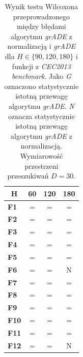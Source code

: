 \documentclass[12pt,a4paper]{report}
\begin{document}
{{{{{{{\begin{table}[h]
\centering
\caption{Wynik testu Wilcoxona przeprowadzonego między błędami algorytmu \emph{grADE} z normalizacją i \emph{grADE} dla $H \in \{90, 120, 180\}$ i funkcji z \emph{CEC2013 benchmark}. Jako \emph{G} oznaczono statystycznie istotną przewagę algorytmu \emph{grADE}. \emph{N} oznacza statystycznie istotną przewagę algorytmu \emph{grADE} z normalizacją. Wymiarowość przestrzeni przeszukiwań $D = 30$.}
\label{Anal11a}
\begin{tabular}{|l|c|c|c|}
\hline
\multicolumn{1}{|c|}{{\bf H}}          & \multicolumn{1}{l|}{{\bf60}} & \multicolumn{1}{l|}{{\bf120}} & \multicolumn{1}{l|}{{\bf180}} \\ \hline
{\bf F1}  & =                               & =                                & =                                \\ \hline
{\bf F2}  & =                               & =                                & =                                \\ \hline
{\bf F3}  & =                               & =                                & =                                \\ \hline
{\bf F4}  & =                               & =                                & =                                \\ \hline
{\bf F5}  & =                               & =                                & =                                \\ \hline
{\bf F6}  & =                               & =                                & N                                \\ \hline
{\bf F7}  & =                               & =                                & =                                \\ \hline
{\bf F8}  & =                               & =                                & =                                \\ \hline
{\bf F9}  & =                               & =                                & =                                \\ \hline
{\bf F10} & =                               & =                                & =                                \\ \hline
{\bf F11} & =                               & =                                & =                                \\ \hline
{\bf F12} & =                               & =                                & N                                \\ \hline

\end{tabular}
\end{table}}}}}}}}
\end{document}
